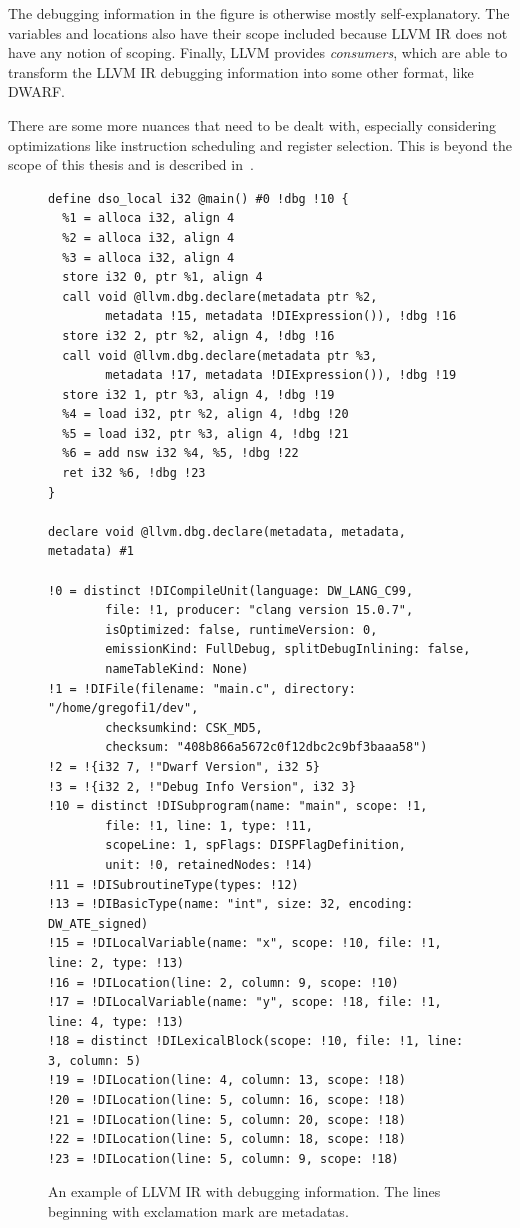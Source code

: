 The debugging information in the figure is otherwise mostly self-explanatory.
The variables and locations also have their scope included because LLVM IR does
not have any notion of scoping. Finally, LLVM provides \textit{consumers},
which are able to transform the LLVM IR debugging information into some other
format, like DWARF.

There are some more nuances that need to be dealt with, especially considering
optimizations like instruction scheduling and register selection. This is
beyond the scope of this thesis and is described in~\cite{llvm-debug-info}.

\begin{figure}
    \begin{verbatim}
define dso_local i32 @main() #0 !dbg !10 {
  %1 = alloca i32, align 4
  %2 = alloca i32, align 4
  %3 = alloca i32, align 4
  store i32 0, ptr %1, align 4
  call void @llvm.dbg.declare(metadata ptr %2,
        metadata !15, metadata !DIExpression()), !dbg !16
  store i32 2, ptr %2, align 4, !dbg !16
  call void @llvm.dbg.declare(metadata ptr %3,
        metadata !17, metadata !DIExpression()), !dbg !19
  store i32 1, ptr %3, align 4, !dbg !19
  %4 = load i32, ptr %2, align 4, !dbg !20
  %5 = load i32, ptr %3, align 4, !dbg !21
  %6 = add nsw i32 %4, %5, !dbg !22
  ret i32 %6, !dbg !23
}

declare void @llvm.dbg.declare(metadata, metadata, metadata) #1

!0 = distinct !DICompileUnit(language: DW_LANG_C99, 
        file: !1, producer: "clang version 15.0.7", 
        isOptimized: false, runtimeVersion: 0, 
        emissionKind: FullDebug, splitDebugInlining: false, 
        nameTableKind: None)
!1 = !DIFile(filename: "main.c", directory: "/home/gregofi1/dev",
        checksumkind: CSK_MD5,
        checksum: "408b866a5672c0f12dbc2c9bf3baaa58")
!2 = !{i32 7, !"Dwarf Version", i32 5}
!3 = !{i32 2, !"Debug Info Version", i32 3}
!10 = distinct !DISubprogram(name: "main", scope: !1,
        file: !1, line: 1, type: !11,
        scopeLine: 1, spFlags: DISPFlagDefinition,
        unit: !0, retainedNodes: !14)
!11 = !DISubroutineType(types: !12)
!13 = !DIBasicType(name: "int", size: 32, encoding: DW_ATE_signed)
!15 = !DILocalVariable(name: "x", scope: !10, file: !1, line: 2, type: !13)
!16 = !DILocation(line: 2, column: 9, scope: !10)
!17 = !DILocalVariable(name: "y", scope: !18, file: !1, line: 4, type: !13)
!18 = distinct !DILexicalBlock(scope: !10, file: !1, line: 3, column: 5)
!19 = !DILocation(line: 4, column: 13, scope: !18)
!20 = !DILocation(line: 5, column: 16, scope: !18)
!21 = !DILocation(line: 5, column: 20, scope: !18)
!22 = !DILocation(line: 5, column: 18, scope: !18)
!23 = !DILocation(line: 5, column: 9, scope: !18)
    \end{verbatim}
    \caption{An example of LLVM IR with debugging information. The lines
    beginning with exclamation mark are metadatas.}
    \label{fig:llvm-ir-debug}
\end{figure}

